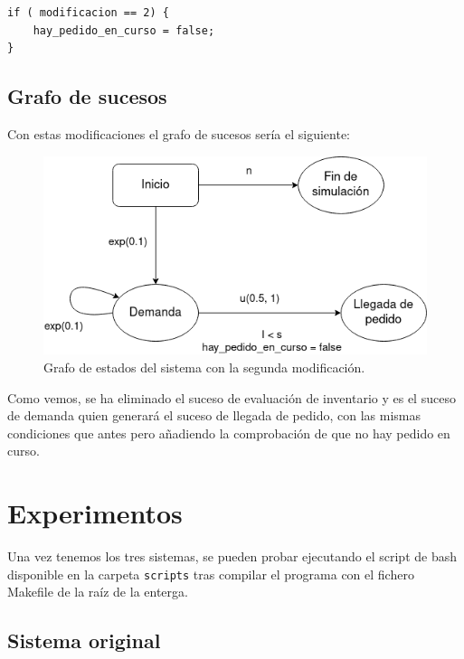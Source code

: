 \documentclass[12pt, spanish]{article}
\begin{document}
\begin{lstlisting}
if ( modificacion == 2) {
	hay_pedido_en_curso = false;
}
\end{lstlisting}

\subsection{Grafo de sucesos}

Con estas modificaciones el grafo de sucesos sería el siguiente:

\begin{figure}[H]
  \centering
   \includegraphics[width=\textwidth]{grafo_sucesos_mod2.png}
	\caption{Grafo de estados del sistema con la segunda modificación.}
\end{figure}

Como vemos, se ha eliminado el suceso de evaluación de inventario y es el suceso de demanda quien generará el suceso de llegada de pedido, con las mismas condiciones que antes pero añadiendo la comprobación de que no hay pedido en curso.



\section{Experimentos}

Una vez tenemos los tres sistemas, se pueden probar ejecutando el script de bash disponible en la carpeta \texttt{scripts} tras compilar el programa con el fichero Makefile de la raíz de la enterga.

\subsection{Sistema original}
\end{document}
